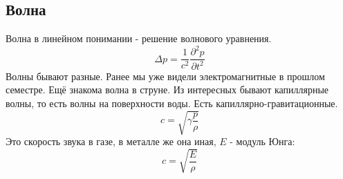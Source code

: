\documentclass[a4paper, 12pt]{article}
\begin{document}
	\subsection{Волна}
	Волна в линейном понимании - решение волнового уравнения. 
	\begin{equation*}
		\Delta p = \frac{1}{c^{2}} \frac{\partial^{2} p}{\partial t^{2}}
	\end{equation*}
	Волны бывают разные. Ранее мы уже видели электромагнитные в прошлом семестре. Ещё знакома волна в струне. Из интересных бывают капиллярные волны, то есть волны на поверхности воды. Есть капиллярно-гравитационные.
	\begin{equation*}
		c = \sqrt{\gamma \frac{p}{\rho}}
	\end{equation*}
	Это скорость звука в газе, в металле же она иная, $E$ - модуль Юнга:
	\begin{equation*}
		c = \sqrt{\frac{E}{\rho}}
	\end{equation*}
	
	
	
\end{document}
